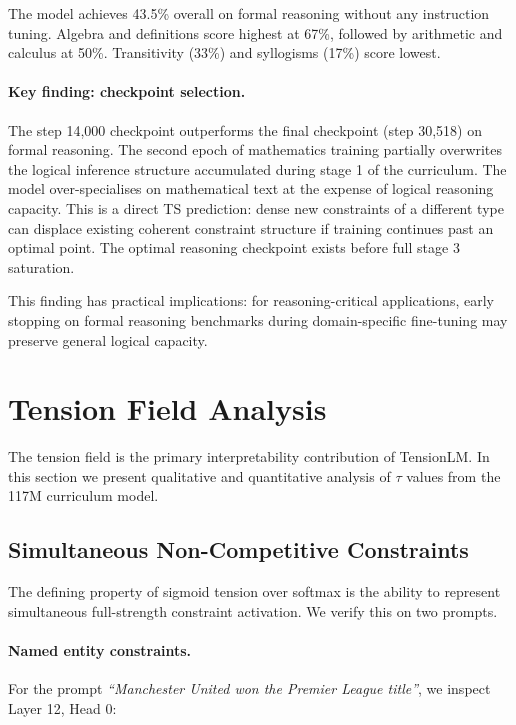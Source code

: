 \documentclass[10pt,a4paper]{article}
\begin{document}
The model achieves 43.5\% overall on formal reasoning without any instruction tuning. Algebra and definitions score highest at 67\%, followed by arithmetic and calculus at 50\%. Transitivity (33\%) and syllogisms (17\%) score lowest.

\paragraph{Key finding: checkpoint selection.} The step 14,000 checkpoint outperforms the final checkpoint (step 30,518) on formal reasoning. The second epoch of mathematics training partially overwrites the logical inference structure accumulated during stage 1 of the curriculum. The model over-specialises on mathematical text at the expense of logical reasoning capacity. This is a direct TS prediction: dense new constraints of a different type can displace existing coherent constraint structure if training continues past an optimal point. The optimal reasoning checkpoint exists before full stage 3 saturation.

This finding has practical implications: for reasoning-critical applications, early stopping on formal reasoning benchmarks during domain-specific fine-tuning may preserve general logical capacity.

\section{Tension Field Analysis}

The tension field is the primary interpretability contribution of TensionLM. In this section we present qualitative and quantitative analysis of $\tau$ values from the 117M curriculum model.

\subsection{Simultaneous Non-Competitive Constraints}

The defining property of sigmoid tension over softmax is the ability to represent simultaneous full-strength constraint activation. We verify this on two prompts.

\paragraph{Named entity constraints.} For the prompt \textit{``Manchester United won the Premier League title''}, we inspect Layer 12, Head 0:
\end{document}

